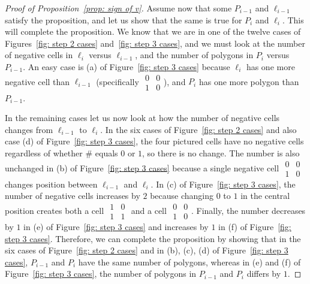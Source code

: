 \documentclass[12pt]{article}
\theoremstyle{plain}
\theoremstyle{remark}
\theoremstyle{definition}
\theoremstyle{remark}
\theoremstyle{definition}
\begin{document}
\begin{proof}[Proof of Proposition~\ref{prop: sign of v}]
Assume now that some $P_{i-1}$ and $\ell_{i-1}$ satisfy the proposition, and let us show that the same is true for $P_{i}$ and $\ell_{i}$. This will complete the proposition. We know that we are in one of the twelve cases of Figures~\ref{fig: step 2 cases} and~\ref{fig: step 3 cases}, and we must look at the number of negative cells in $\ell_{i}$ versus $\ell_{i-1}$, and the number of polygons in $P_{i}$ versus $P_{i-1}$. An easy case is (a) of Figure~\ref{fig: step 3 cases} because $\ell_{i}$ has one more negative cell than $\ell_{i-1}$ (specifically $\begin{smallmatrix} 0 & 0 \\ 1 & 0 \end{smallmatrix}$), and $P_{i}$ has one more polygon than $P_{i-1}$.

In the remaining cases let us now look at how the number of negative cells changes from $\ell_{i-1}$ to $\ell_{i}$. In the six cases of Figure~\ref{fig: step 2 cases} and also case (d) of Figure~\ref{fig: step 3 cases}, the four pictured cells have no negative cells regardless of whether $\#$ equals $0$ or $1$, so there is no change. The number is also unchanged in (b) of Figure~\ref{fig: step 3 cases} because a single negative cell $\begin{smallmatrix} 0 & 0 \\ 1 & 0 \end{smallmatrix}$ changes position between $\ell_{i-1}$ and $\ell_{i}$. In (c) of Figure~\ref{fig: step 3 cases}, the number of negative cells increases by $2$ because changing $0$ to $1$ in the central position creates both a cell $\begin{smallmatrix} 1 & 0 \\ 1 & 1 \end{smallmatrix}$ and a cell $\begin{smallmatrix} 0 & 0 \\ 1 & 0 \end{smallmatrix}$. Finally, the number decreases by $1$ in (e) of Figure~\ref{fig: step 3 cases} and increases by $1$ in (f) of Figure~\ref{fig: step 3 cases}. Therefore, we can complete the proposition by showing that in the six cases of Figure~\ref{fig: step 2 cases} and in (b), (c), (d) of Figure~\ref{fig: step 3 cases}, $P_{i-1}$ and $P_{i}$ have the same number of polygons, whereas in (e) and (f) of Figure~\ref{fig: step 3 cases}, the number of polygons in $P_{i-1}$ and $P_{i}$ differs by $1$.


\end{proof}
\end{document}
